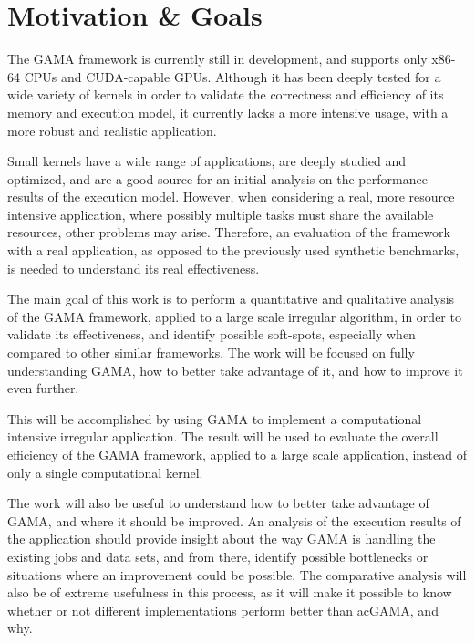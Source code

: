 \documentclass[main.tex]{subfiles}
\begin{document}
\section{Motivation \& Goals}


The \ac{GAMA} framework is currently still in development, and supports only x86-64 \acsp{CPU} and \acs{CUDA}-capable \acsp{GPU}. Although it has been deeply tested for a wide variety of kernels in order to validate the correctness and efficiency of its memory and execution model, it currently lacks a more intensive usage, with a more robust and realistic application.

Small kernels have a wide range of applications, are deeply studied and optimized, and are a good source for an initial analysis on the performance results of the execution model. However, when considering a real, more resource intensive application, where possibly multiple tasks must share the available resources, other problems may arise. Therefore, an evaluation of the framework with a real application, as opposed to the previously used synthetic benchmarks, is needed to understand its real effectiveness.

The main goal of this work is to perform a quantitative and qualitative analysis of the \ac{GAMA} framework, applied to a large scale irregular algorithm, in order to validate its effectiveness, and identify possible soft-spots, especially when compared to other similar frameworks. The work will be focused on fully understanding \ac{GAMA}, how to better take advantage of it, and how to improve it even further.

This will be accomplished by using \ac{GAMA} to implement a computational intensive irregular application. The result will be used to evaluate the overall efficiency of the \ac{GAMA} framework, applied to a large scale application, instead of only a single computational kernel.

The work will also be useful to understand how to better take advantage of \ac{GAMA}, and where it should be improved. An analysis of the execution results of the application should provide insight about the way \ac{GAMA} is handling the existing jobs and data sets, and from there, identify possible bottlenecks or situations where an improvement could be possible. The comparative analysis will also be of extreme usefulness in this process, as it will make it possible to know whether or not different implementations perform better than ac{GAMA}, and why.
\end{document}
